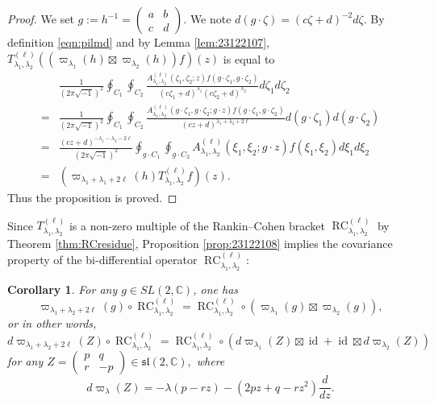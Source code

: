\documentclass[12pt]{amsart}
\newcommand{\RC}{\operatorname{RC}}
\theoremstyle{plain} %
\newtheorem{corollary}{Corollary} %
\theoremstyle{definition} %
\theoremstyle{remark} %
\begin{document}
\begin{proof}
We set $g:=h^{-1}=\begin{pmatrix} a & b \\ c & d\end{pmatrix}$.  
We note $d (g \cdot \zeta)=(c \zeta+ d)^{-2}d \zeta$.  
By definition \eqref{eqn:pilmd} and by Lemma \ref{lem:23122107}, 
$
  T_{\lambda_1,\lambda_2}^{(\ell)}((\varpi_{\lambda_1}(h) \boxtimes \varpi_{\lambda_2}(h))f)(z)
$ is equal to 
\begin{align*}
&\frac 1 {(2 \pi \sqrt{-1})^2}
  \oint_{C_1} \oint_{C_2}
  \frac{A_{\lambda_1, \lambda_2}^{(\ell)}(\zeta_1, \zeta_2; z)f(g \cdot \zeta_1, g\cdot \zeta_2)}
  {(c\zeta_1+d)^{\lambda_1} (c \zeta_2+d)^{\lambda_2}} d \zeta_1 d \zeta_2
\\
=&\frac 1 {(2 \pi \sqrt{-1})^2}
  \oint_{C_1} \oint_{C_2}
  \frac{A_{\lambda_1, \lambda_2}^{(\ell)}(g\cdot\zeta_1, g\cdot\zeta_2; g\cdot z)f(g\cdot \zeta_1, g\cdot \zeta_2)}
  {(c z+d)^{\lambda_1 +\lambda_2+2 \ell}} d (g\cdot\zeta_1) d (g\cdot\zeta_2)
\\
=&
\frac{(c z+d)^{-\lambda_1 -\lambda_2-2 \ell}}{(2 \pi \sqrt{-1})^2}
  \oint_{g\cdot C_1} \oint_{g\cdot C_2}
  A_{\lambda_1, \lambda_2}^{(\ell)}(\xi_1, \xi_2; g\cdot z)
        f(\xi_1, \xi_2)
   d \xi_1 d \xi_2
\\
=& (\varpi_{\lambda_1+\lambda_1+2 \ell}(h)T_{\lambda_1, \lambda_2}^{(\ell)}f)(z).  
\end{align*}
Thus the proposition is proved.  
\end{proof}



Since $T_{\lambda_1, \lambda_2}^{(\ell)}$ is a non-zero multiple of the Rankin--Cohen bracket
 $\RC_{\lambda_1, \lambda_2}^{(\ell)}$
 by Theorem \ref{thm:RCresidue}, 
 Proposition \ref{prop:23122108} implies the covariance property
 of the bi-differential operator $\RC_{\lambda_1, \lambda_2}^{(\ell)}$:

\begin{corollary}
\label{cor:SBO}
For any $g \in SL(2,{\mathbb{C}})$, 
 one has
\begin{equation}
\label{eqn:SBO}
  \varpi_{\lambda_1+\lambda_2+ 2 \ell}(g)\circ \RC_{\lambda_1, \lambda_2}^{(\ell)}
=
  \RC_{\lambda_1, \lambda_2}^{(\ell)}
  \circ
  (\varpi_{\lambda_1}(g) \boxtimes \varpi_{\lambda_2}(g)), 
\end{equation}
or in other words, 
\[
  d \varpi_{\lambda_1+\lambda_2+ 2 \ell}(Z)\circ \RC_{\lambda_1, \lambda_2}^{(\ell)}
=
  \RC_{\lambda_1, \lambda_2}^{(\ell)}
  \circ
  (d \varpi_{\lambda_1}(Z) \boxtimes \operatorname{id} + \operatorname{id} \boxtimes d \varpi_{\lambda_2}(Z))
\]
for any 
$
   Z=\begin{pmatrix} p & q \\ r & -p \end{pmatrix}
\in {\mathfrak{s l}}(2, {\mathbb{C}}), 
$
 where 
\[
   d \varpi_{\lambda}(Z)=-\lambda(p-r z) -(2 p z + q - r z^2)\frac d {d z}.
\]
\end{corollary}
\end{document}
